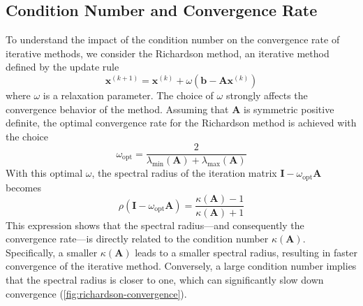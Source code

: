 \subsection{Condition Number and Convergence Rate}
\label{sec:condition-number-convergence-rate}
To understand the impact of the condition number on the convergence rate of iterative methods, we consider the Richardson method, an iterative method defined by the update rule
\begin{equation*}
    \mathbf{x}^{(k+1)} = \mathbf{x}^{(k)} + \omega (\mathbf{b} - \mathbf{A}\mathbf{x}^{(k)})
\end{equation*}
where $\omega$ is a relaxation parameter. The choice of $\omega$ strongly affects the convergence behavior of the method. Assuming that $\mathbf{A}$ is symmetric positive definite, the optimal convergence rate for the Richardson method is achieved with the choice
\begin{equation*}
    \omega_{\text{opt}} = \frac{2}{\lambda_{\min}(\mathbf{A}) + \lambda_{\max}(\mathbf{A})}
\end{equation*}
With this optimal $\omega$, the spectral radius of the iteration matrix $\mathbf{I} - \omega_{\text{opt}} \mathbf{A}$ becomes
\begin{equation*}
    \rho(\mathbf{I} - \omega_{\text{opt}} \mathbf{A}) = \frac{\kappa(\mathbf{A}) - 1}{\kappa(\mathbf{A}) + 1}
\end{equation*}
This expression shows that the spectral radius---and consequently the convergence rate---is directly related to the condition number $\kappa(\mathbf{A})$. Specifically, a smaller $\kappa(\mathbf{A})$ leads to a smaller spectral radius, resulting in faster convergence of the iterative method. Conversely, a large condition number implies that the spectral radius is closer to one, which can significantly slow down convergence (\autoref{fig:richardson-convergence}).

